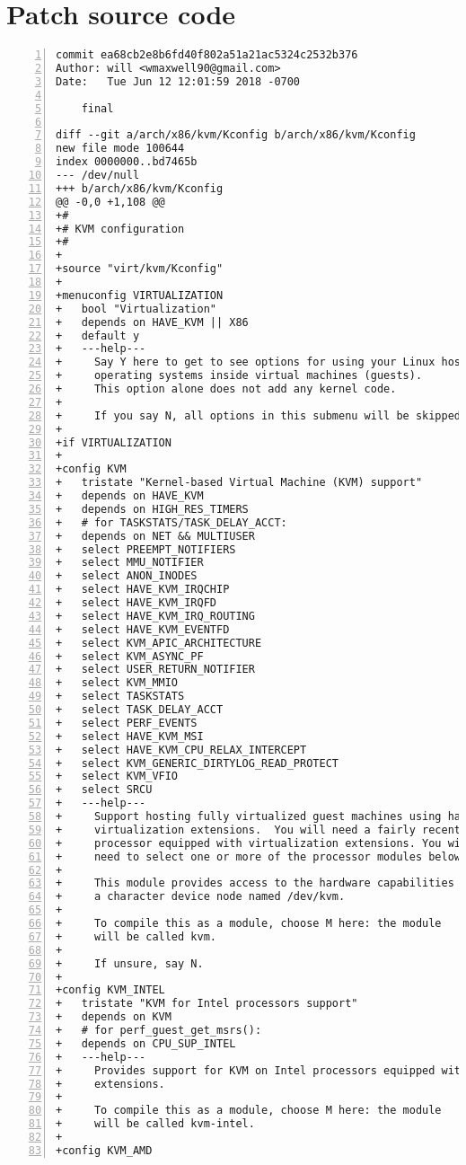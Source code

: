 \documentclass[onecolumn, draftclsnofoot,10pt, compsoc]{IEEEtran}
\begin{document}
    \section{Patch source code}
    \begin{lstlisting}[numbers=left]
        commit ea68cb2e8b6fd40f802a51a21ac5324c2532b376
Author: will <wmaxwell90@gmail.com>
Date:   Tue Jun 12 12:01:59 2018 -0700

    final

diff --git a/arch/x86/kvm/Kconfig b/arch/x86/kvm/Kconfig
new file mode 100644
index 0000000..bd7465b
--- /dev/null
+++ b/arch/x86/kvm/Kconfig
@@ -0,0 +1,108 @@
+#
+# KVM configuration
+#
+
+source "virt/kvm/Kconfig"
+
+menuconfig VIRTUALIZATION
+	bool "Virtualization"
+	depends on HAVE_KVM || X86
+	default y
+	---help---
+	  Say Y here to get to see options for using your Linux host to run other
+	  operating systems inside virtual machines (guests).
+	  This option alone does not add any kernel code.
+
+	  If you say N, all options in this submenu will be skipped and disabled.
+
+if VIRTUALIZATION
+
+config KVM
+	tristate "Kernel-based Virtual Machine (KVM) support"
+	depends on HAVE_KVM
+	depends on HIGH_RES_TIMERS
+	# for TASKSTATS/TASK_DELAY_ACCT:
+	depends on NET && MULTIUSER
+	select PREEMPT_NOTIFIERS
+	select MMU_NOTIFIER
+	select ANON_INODES
+	select HAVE_KVM_IRQCHIP
+	select HAVE_KVM_IRQFD
+	select HAVE_KVM_IRQ_ROUTING
+	select HAVE_KVM_EVENTFD
+	select KVM_APIC_ARCHITECTURE
+	select KVM_ASYNC_PF
+	select USER_RETURN_NOTIFIER
+	select KVM_MMIO
+	select TASKSTATS
+	select TASK_DELAY_ACCT
+	select PERF_EVENTS
+	select HAVE_KVM_MSI
+	select HAVE_KVM_CPU_RELAX_INTERCEPT
+	select KVM_GENERIC_DIRTYLOG_READ_PROTECT
+	select KVM_VFIO
+	select SRCU
+	---help---
+	  Support hosting fully virtualized guest machines using hardware
+	  virtualization extensions.  You will need a fairly recent
+	  processor equipped with virtualization extensions. You will also
+	  need to select one or more of the processor modules below.
+
+	  This module provides access to the hardware capabilities through
+	  a character device node named /dev/kvm.
+
+	  To compile this as a module, choose M here: the module
+	  will be called kvm.
+
+	  If unsure, say N.
+
+config KVM_INTEL
+	tristate "KVM for Intel processors support"
+	depends on KVM
+	# for perf_guest_get_msrs():
+	depends on CPU_SUP_INTEL
+	---help---
+	  Provides support for KVM on Intel processors equipped with the VT
+	  extensions.
+
+	  To compile this as a module, choose M here: the module
+	  will be called kvm-intel.
+
+config KVM_AMD

\end{lstlisting}
\end{document}
